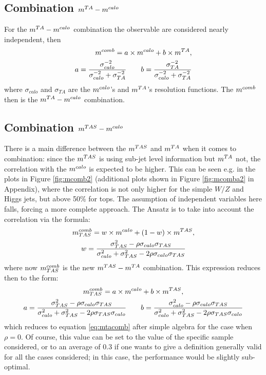 \subsection{Combination $m^{TA}-m^{calo}$ }

For the $m^{TA}-m^{calo}$ combination the observable are considered nearly independent, then
\begin{equation}\begin{split}
 m^{comb}= a\times m^{calo} + b \times m^{TA},\\
 a=\frac{\sigma_{calo}^{-2}}{\sigma_{calo}^{-2}+\sigma_{TA}^{-2}} \qquad b=\frac{\sigma_{TA}^{-2}}{\sigma_{calo}^{-2}+\sigma_{TA}^{-2}}
\end{split}
\label{eq:mtacomb}
\end{equation}
where $\sigma_{calo}$ and $\sigma_{TA}$ are the $m^{calo}$'s and $m^{TA}$'s resolution functions. The $m^{comb}$ then is the $m^{TA}-m^{calo}$ combination.

\subsection{Combination $m^{TAS}-m^{calo}$ }

There is a main difference between the $m^{TAS}$ and $m^{TA}$ when it comes to combination: since the $m^{TAS}$ is using sub-jet level information but $m^{TA}$ not, the correlation with the $m^{calo}$ is expected to be higher.
This can be seen e.g. in the plots in Figure \ref{fig:mcomb2} (additional plots shown in Figure \ref{fig:mcomba2} in Appendix), where the correlation is not only higher for the simple $W/Z$ and Higgs jets, but above 50\% for tops. The assumption of independent variables here falls, forcing a more complete approach. The Ansatz is to take into account the correlation via the formula:
\begin{equation}
\begin{gathered}
m^{comb}_{TAS}= w\times m^{calo} + (1-w)\times m^{TAS},\\
w=\frac{\sigma_{TAS}^2-\rho\sigma_{calo}\sigma_{TAS}}{\sigma_{calo}^2+\sigma_{TAS}^2-2\rho\sigma_{calo}\sigma_{TAS}}
\end{gathered}
\label{eq:mtascomb}
\end{equation}
% 
where now $m^{comb}_{TAS}$ is the new $m^{TAS}-m^{TA}$ combination. This expression reduces then to the form:
\begin{equation}
\begin{gathered}
m^{comb}_{TAS}= a\times m^{calo} + b\times m^{TAS},\\
a=\frac{\sigma_{TAS}^2-\rho\sigma_{calo}\sigma_{TAS}}{\sigma_{calo}^2+\sigma_{TAS}^2-2\rho\sigma_{TAS}\sigma_{calo}}\qquad b=\frac{\sigma_{calo}^2-\rho\sigma_{calo}\sigma_{TAS}}{\sigma_{calo}^2+\sigma_{TAS}^2-2\rho\sigma_{TAS}\sigma_{calo}}
\end{gathered}
\end{equation}
which reduces to equation \eqref{eq:mtacomb} after simple algebra for the case when $\rho=0$. Of course, this value can be set to the value of the specific sample considered, or to an average of 0.3 if one wants to give a definition generally valid for all the cases considered; in this case, the performance would be slightly sub-optimal.

